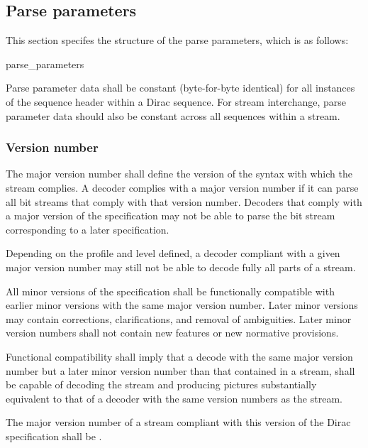 \subsection{Parse parameters}
\label{parseparameters}

This section specifes the structure of the parse parameters, which is as follows:

\begin{pseudo}{parse\_parameters}{}
\end{pseudo}

Parse parameter data shall be constant (byte-for-byte identical) for all instances 
of the sequence header within a Dirac sequence. For stream interchange, parse
parameter data should also be constant across all sequences within a stream.

\subsubsection{Version number}

The major version number shall define the version of the syntax with 
which the stream complies. A decoder complies with a major version 
number if it can parse all bit streams that comply with 
that version number. Decoders that comply with a major version of 
the specification may not be able to parse the bit stream corresponding 
to a later specification.

Depending on the profile and level defined, a decoder compliant 
with a given major version number may still not be able to decode 
fully all parts of a stream.

All minor versions of the specification shall be functionally compatible 
with earlier minor versions with the same major version number. Later minor 
versions may contain corrections, clarifications, and removal of ambiguities. 
Later minor version numbers shall not contain new features or new 
normative provisions.

Functional compatibility shall imply that a decode with the same major version
number but a later minor version number than that contained in a stream, shall
be capable of decoding the stream and producing pictures substantially equivalent
to that of a decoder with the same version numbers as the stream.

The major version number of a stream compliant with this version 
of the Dirac specification shall be \MajorVersion.

